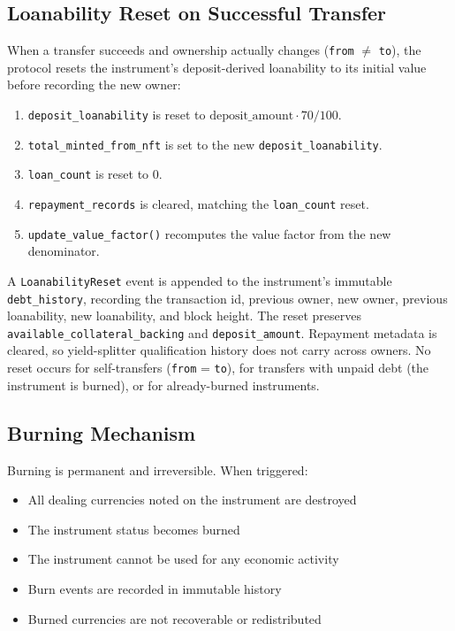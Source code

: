 \documentclass[11pt,a4paper]{article}
\begin{document}
\subsection{Loanability Reset on Successful Transfer}
When a transfer succeeds and ownership actually changes (\texttt{from} $\neq$ \texttt{to}), the protocol resets the instrument's deposit-derived loanability to its initial value before recording the new owner:
\begin{enumerate}
\item \texttt{deposit\_loanability} is reset to $\text{deposit\_amount} \cdot 70 / 100$.
\item \texttt{total\_minted\_from\_nft} is set to the new \texttt{deposit\_loanability}.
\item \texttt{loan\_count} is reset to $0$.
\item \texttt{repayment\_records} is cleared, matching the \texttt{loan\_count} reset.
\item \texttt{update\_value\_factor()} recomputes the value factor from the new denominator.
\end{enumerate}
A \texttt{LoanabilityReset} event is appended to the instrument's immutable \texttt{debt\_history}, recording the transaction id, previous owner, new owner, previous loanability, new loanability, and block height. The reset preserves \texttt{available\_collateral\_backing} and \texttt{deposit\_amount}. Repayment metadata is cleared, so yield-splitter qualification history does not carry across owners. No reset occurs for self-transfers (\texttt{from} = \texttt{to}), for transfers with unpaid debt (the instrument is burned), or for already-burned instruments.

\subsection{Burning Mechanism}
Burning is permanent and irreversible. When triggered:
\begin{itemize}
\item All dealing currencies noted on the instrument are destroyed
\item The instrument status becomes burned
\item The instrument cannot be used for any economic activity
\item Burn events are recorded in immutable history
\item Burned currencies are not recoverable or redistributed
\end{itemize}
\end{document}
